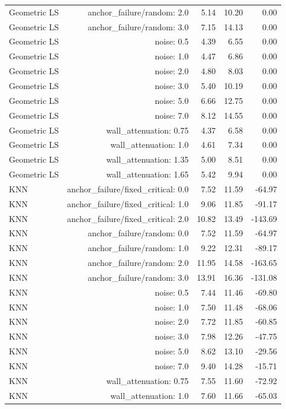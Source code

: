 \begin{table}[t]
\begin{tabular}{lrrrr}
Geometric LS & anchor\_failure/random: 2.0 & 5.14 & 10.20 & 0.00 \\
Geometric LS & anchor\_failure/random: 3.0 & 7.15 & 14.13 & 0.00 \\
Geometric LS & noise: 0.5 & 4.39 & 6.55 & 0.00 \\
Geometric LS & noise: 1.0 & 4.47 & 6.86 & 0.00 \\
Geometric LS & noise: 2.0 & 4.80 & 8.03 & 0.00 \\
Geometric LS & noise: 3.0 & 5.40 & 10.19 & 0.00 \\
Geometric LS & noise: 5.0 & 6.66 & 12.75 & 0.00 \\
Geometric LS & noise: 7.0 & 8.12 & 14.55 & 0.00 \\
Geometric LS & wall\_attenuation: 0.75 & 4.37 & 6.58 & 0.00 \\
Geometric LS & wall\_attenuation: 1.0 & 4.61 & 7.34 & 0.00 \\
Geometric LS & wall\_attenuation: 1.35 & 5.00 & 8.51 & 0.00 \\
Geometric LS & wall\_attenuation: 1.65 & 5.42 & 9.94 & 0.00 \\
KNN & anchor\_failure/fixed\_critical: 0.0 & 7.52 & 11.59 & -64.97 \\
KNN & anchor\_failure/fixed\_critical: 1.0 & 9.06 & 11.85 & -91.17 \\
KNN & anchor\_failure/fixed\_critical: 2.0 & 10.82 & 13.49 & -143.69 \\
KNN & anchor\_failure/random: 0.0 & 7.52 & 11.59 & -64.97 \\
KNN & anchor\_failure/random: 1.0 & 9.22 & 12.31 & -89.17 \\
KNN & anchor\_failure/random: 2.0 & 11.95 & 14.58 & -163.65 \\
KNN & anchor\_failure/random: 3.0 & 13.91 & 16.36 & -131.08 \\
KNN & noise: 0.5 & 7.44 & 11.46 & -69.80 \\
KNN & noise: 1.0 & 7.50 & 11.48 & -68.06 \\
KNN & noise: 2.0 & 7.72 & 11.85 & -60.85 \\
KNN & noise: 3.0 & 7.98 & 12.26 & -47.75 \\
KNN & noise: 5.0 & 8.62 & 13.10 & -29.56 \\
KNN & noise: 7.0 & 9.40 & 14.28 & -15.71 \\
KNN & wall\_attenuation: 0.75 & 7.55 & 11.60 & -72.92 \\
KNN & wall\_attenuation: 1.0 & 7.60 & 11.66 & -65.03 \\

\end{tabular}
\end{table}

